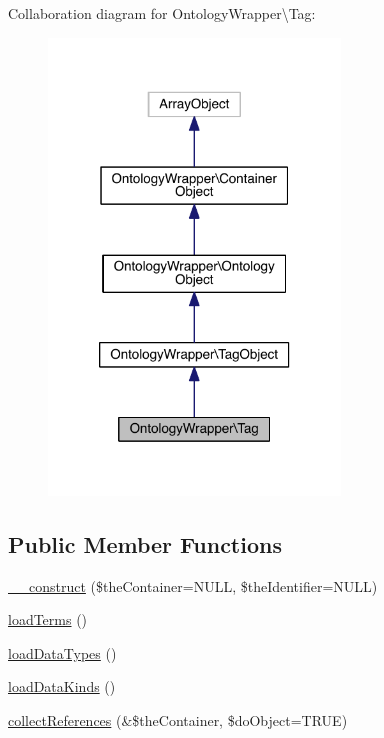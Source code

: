 Collaboration diagram for Ontology\-Wrapper\textbackslash{}Tag\-:
\nopagebreak
\begin{figure}[H]
\begin{center}
\leavevmode
\includegraphics[width=220pt]{class_ontology_wrapper_1_1_tag__coll__graph}
\end{center}
\end{figure}
\subsection*{Public Member Functions}
\begin{DoxyCompactItemize}
\item 
\hyperlink{class_ontology_wrapper_1_1_tag_aa1e0088ed61d741f3679c3a3128007b1}{\-\_\-\-\_\-construct} (\$the\-Container=N\-U\-L\-L, \$the\-Identifier=N\-U\-L\-L)
\item 
\hyperlink{class_ontology_wrapper_1_1_tag_aa2e64f9c1b9f4cd55e5f31db154057b7}{load\-Terms} ()
\item 
\hyperlink{class_ontology_wrapper_1_1_tag_a8fafe8f4c5ac0208e0428a857d291103}{load\-Data\-Types} ()
\item 
\hyperlink{class_ontology_wrapper_1_1_tag_aaf0f041294cc04e07c0e92640e7544e7}{load\-Data\-Kinds} ()
\item 
\hyperlink{class_ontology_wrapper_1_1_tag_af565f8f24f7dff4ce1c3f40e9953345b}{collect\-References} (\&\$the\-Container, \$do\-Object=T\-R\-U\-E)
\end{DoxyCompactItemize}
